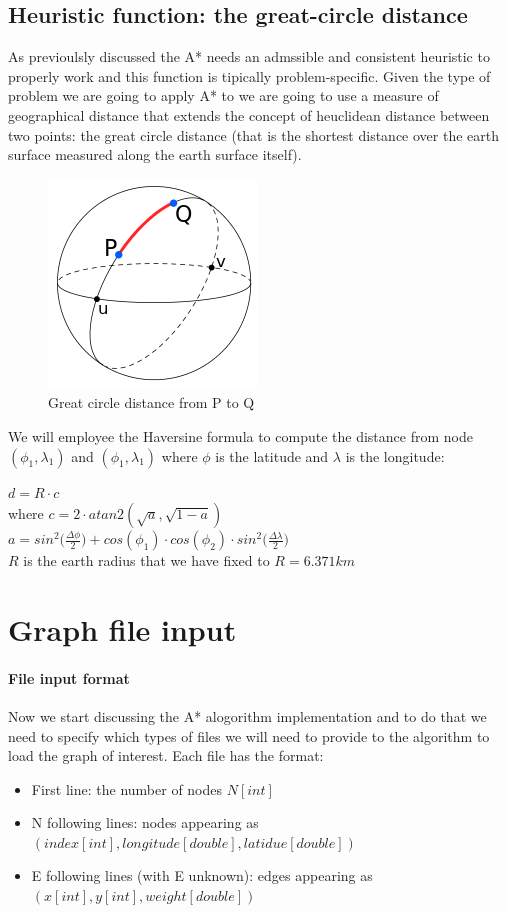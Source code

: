 \documentclass[twocolumn, switch]{article} %
\begin{document}
\subsection{Heuristic function: the great-circle distance}
As previoulsly discussed the A* needs an admssible and consistent heuristic to properly work and this
function is tipically problem-specific. Given the type of problem we are going to apply A* to we are going
to use a measure of geographical distance that extends the concept of heuclidean distance between two points:
the great circle distance (that is the shortest distance over the earth surface measured along the
earth surface itself).
\begin{figure}[ht!]
  \centering
  \includegraphics[width=0.5\linewidth]{haversine.png}
  \caption{Great circle distance from P to Q}
  \label{haversine}
\end{figure}
We will employee the Haversine formula to compute the distance from node $(\phi_1,\lambda_1)$
and $(\phi_1,\lambda_1)$ where $\phi$ is the latitude and $\lambda$ is the longitude:
\begin{center}
  $d = R \cdot c$\\
  where $c = 2 \cdot atan2(\sqrt{a},\sqrt{1-a})$\\
  $a = sin^2\Big({\frac{\Delta \phi}{2}}\Big) + cos(\phi_1) \cdot cos(\phi_2) \cdot sin^2\Big({\frac{\Delta \lambda}{2}}\Big)$
  \\$R$ is the earth radius that we have fixed to $R=6.371km$
\end{center}

\section{Graph file input}
\paragraph{File input format} 
Now we start discussing the A* alogorithm implementation and to do that we need to specify which 
types of files we will need to provide to the algorithm to load the graph of interest. Each file has 
the format:
\begin{itemize}
    \item First line: the number of nodes $N[int]$
    \item N following lines: nodes appearing as $(index[int], longitude[double], latidue[double])$
    \item E following lines (with E unknown): edges appearing as $(x[int], y[int], weight[double])$
\end{itemize}
\end{document}
